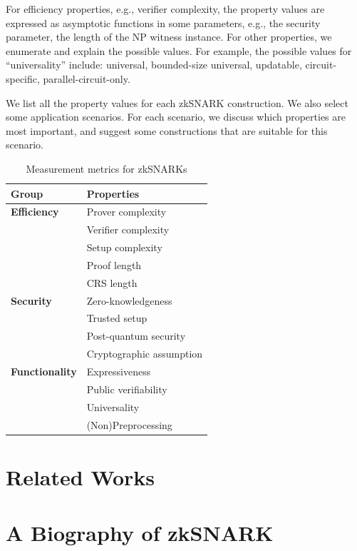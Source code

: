 \documentclass[acmtog]{acmart}
\begin{document}
For efficiency properties, e.g., verifier complexity, the property values are expressed as asymptotic functions in some parameters, e.g., the security parameter, the length of the NP witness instance.
For other properties, we enumerate and explain the possible values.
For example, the possible values for ``universality'' include: universal, bounded-size universal, updatable, circuit-specific, parallel-circuit-only.

We list all the property values for each zkSNARK construction.
We also select some application scenarios.
For each scenario, we discuss which properties are most important, and suggest some constructions that are suitable for this scenario.

\begin{table}[tb]
	\caption{Measurement metrics for zkSNARKs}
	\label{tab:measure}
	\centering

	\begin{tabular}{ll}
	\hline

	\hline
	\textbf{Group} & \textbf{Properties} \\
	\hline
	\textbf{Efficiency} & Prover complexity \\
	& Verifier complexity \\
	& Setup complexity \\
	& Proof length \\
	& CRS length \\ \hline
	\textbf{Security} & Zero-knowledgeness \\
	& Trusted setup \\
	& Post-quantum security \\
	& Cryptographic assumption \\ \hline
	\textbf{Functionality} & Expressiveness \\
	& Public verifiability \\
	& Universality \\
	& (Non)Preprocessing \\
	\hline

	\hline
	\end{tabular}
\end{table}


\section{Related Works}

\section{A Biography of zkSNARK}
\label{sec:history}
\end{document}
